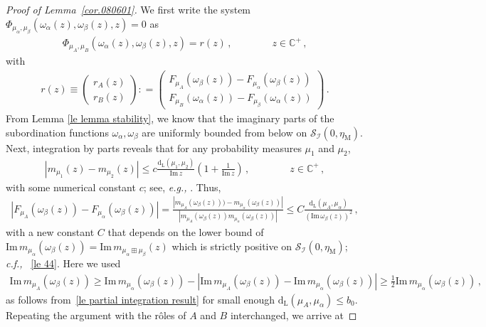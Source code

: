 \documentclass[10pt,reqno]{amsart}
\numberwithin{equation}{section}
\theoremstyle{plain}
\numberwithin{kevin}{section}
\theoremstyle{remark}
\newcommand{\im}{\mathrm{Im}\,}
\newcommand{\C}{{\mathbb C}}
\newcommand{\deq}{\mathrel{\mathop:}=}
\newcommand{\eg}{\emph{e.g., }}
\newcommand{\cf}{\emph{c.f., }}
\newcommand{\PP}{\Phi}
\newcommand{\dL}{\mathrm{d}_{\mathrm{L}}}
\begin{document}
\begin{proof}[Proof of Lemma~\ref{cor.080601}] We first write the system $\PP_{\mu_\alpha,\mu_\beta}(\omega_\alpha(z),\omega_\beta(z),z)=0$ as 
\begin{align*}
\PP_{\mu_A,\mu_B}(\omega_\alpha(z),\omega_\beta(z),z)=r(z)\,, \qquad \qquad z\in\C^+\,,
\end{align*}
with
\begin{align}
 r(z)\equiv\left(\begin{array}{c}r_A(z)\\ r_B(z)\end{array} \right)\deq\left(\begin{array}{c}F_{\mu_A}(\omega_\beta(z))-F_{\mu_\alpha}(\omega_\beta(z)) \\ F_{\mu_B}(\omega_\alpha(z))-F_{\mu_\beta}(\omega_\alpha(z))\end{array} \right)\,.
\end{align}
From Lemma \ref{le lemma stability}, we know that the imaginary parts of the subordination functions $\omega_\alpha,\omega_\beta$ are uniformly bounded from below on $\mathcal{S}_{\mathcal{I}}(0,\eta_\mathrm{M})$. Next, integration by parts reveals that for any probability measures $\mu_1$ and $\mu_2$,
\begin{align}\label{le partial integration result}
 |m_{\mu_1}(z)-m_{\mu_2}(z)|\le c\frac{\dL(\mu_1,\mu_2)}{\im z}\left(1+\frac{1}{\im z}\right)\,,\qquad\qquad z\in\C^+\,,
\end{align}
with some numerical constant $c$; see, \eg \cite{Kargin}. Thus,
 \begin{align}
  |F_{\mu_A}(\omega_\beta(z))-F_{\mu_\alpha}(\omega_\beta(z))|=\frac{ |m_{\mu_A}(\omega_\beta(z)))-m_{\mu_\alpha}(\omega_\beta(z))|}{|m_{\mu_A}(\omega_\beta(z)) m_{\mu_\alpha}(\omega_\beta(z))|}\le C \frac{\dL(\mu_A,\mu_\alpha)}{(\im \omega_\beta(z))^2}\,,
 \end{align}
with a new constant $C$ that depends on the lower bound of $ \im m_{\mu_\alpha}(\omega_\beta(z)) = \im m_{\mu_\alpha\boxplus\mu_\beta}(z)$ which is strictly positive on $\mathcal{S}_{\mathcal{I}}(0,\eta_{\mathrm{M}})$; \cf~\eqref{le 44}.
 Here we used 
\begin{align*}
 \im m_{\mu_A}(\omega_\beta(z))\ge\im m_{\mu_\alpha}(\omega_\beta(z))-| \im m_{\mu_A}(\omega_\beta(z))- \im m_{\mu_\alpha}(\omega_\beta(z))|\ge\frac{1}{2} \im m_{\mu_\alpha}(\omega_\beta(z)) \,,
\end{align*}
as follows from~\eqref{le partial integration result} for small enough $\dL(\mu_A,\mu_\alpha)\le b_0$. Repeating the argument with  the r\^oles of $A$ and $B$ interchanged, we arrive at

\end{proof}
\end{document}
